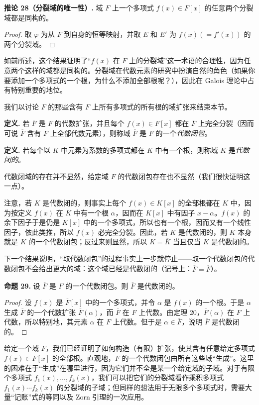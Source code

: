 \noindent\textbf{推论 28（分裂域的唯一性）.} 域 $F$ 上一个多项式 $f(x)\in F[x]$ 的任意两个分裂域都是同构的。


\begin{proof}
	取 $\varphi$ 为从 $F$ 到自身的恒等映射，并取 $E$ 和 $E'$ 为 $f(x)(=f'(x))$ 的两个分裂域。
\end{proof}

如前所述，这个结果证明了“$f(x)$ 在 $F$ 上的分裂域”这一术语的合理性，因为任意两个这样的域都是同构的。分裂域在代数元素的研究中扮演自然的角色（如果你要添加一个多项式的一个根，为什么不添加全部根呢？），因此在 Galois 理论中占有特别重要的地位。

我们以讨论 $F$ 的那些含有 $F$ 上所有多项式的所有根的域扩张来结束本节。

\noindent\textbf{定义.} 若 $\overline F$ 是 $F$ 的代数扩张，并且每个 $f(x)\in F[x]$ 都在 $\overline F$ 上完全分裂（因而可说 $\overline F$ 含有 $F$ 上全部代数元素），则称域 $\overline F$ 是 $F$ 的一个\emph{代数闭包}。


\noindent\textbf{定义.} 若每个以 $K$ 中元素为系数的多项式都在 $K$ 中有一个根，则称域 $K$ 是\emph{代数闭的}。


代数闭域的存在并不显然，给定域 $F$ 的代数闭包存在也不显然（我们很快证明这一点）。

注意，若 $K$ 是代数闭的，则事实上每个 $f(x)\in K[x]$ 的全部根都在 $K$ 中，因为按定义 $f(x)$ 在 $K$ 中有一个根 $\alpha$，因而在 $K[x]$ 中有因子 $x-\alpha$。$f(x)$ 的余下因子于是仍是 $K[x]$ 中的一个多项式，所以也有一个根，因而又有一个线性因子，依此类推，所以 $f(x)$ 必完全分裂。因此，若 $K$ 是代数闭的，则 $K$ 本身就是 $K$ 的一个代数闭包；反过来则显然，所以 $K=\overline K$ 当且仅当 $K$ 是代数闭的。

下一个结果说明，“取代数闭包”的过程事实上一步就停止——取一个代数闭包的代数闭包不会给出更大的域：这个域已经是代数闭的（记号上：$\overline{\overline F}=\overline F$）。

\noindent\textbf{命题 29.} 设 $\overline F$ 是 $F$ 的一个代数闭包。则 $\overline F$ 是代数闭的。


\begin{proof}
	设 $f(x)$ 是 $\overline F[x]$ 中的一个多项式，并令 $\alpha$ 是 $f(x)$ 的一个根。于是 $\alpha$ 生成 $\overline F$ 的一个代数扩张 $\overline F(\alpha)$，而 $\overline F$ 在 $F$ 上代数。由定理 20，$\overline F(\alpha)$ 在 $F$ 上代数，所以特别地，其元素 $\alpha$ 在 $F$ 上代数。但于是 $\alpha\in\overline F$，说明 $\overline F$ 是代数闭的。
\end{proof}

给定一个域 $F$，我们已经证明了如何构造（有限）扩张，使其含有任意给定多项式 $f(x)\in F[x]$ 的全部根。直观地，$F$ 的一个代数闭包由所有这些域“生成”。这里的困难在于“生成”在哪里进行，因为它们并不全是某一个给定域的子域。对于有限个多项式 $f_1(x),\ldots,f_k(x)$，我们可以把它们的分裂域看作乘积多项式 $f_1(x)\cdots f_k(x)$ 的分裂域的子域；但同样的想法用于无限多个多项式时，需要大量“记账”式的等同以及 Zorn 引理的一次应用。

